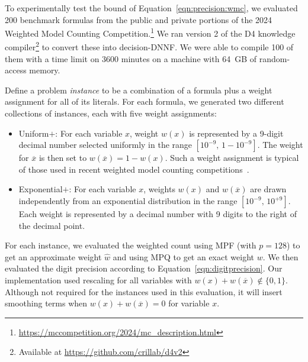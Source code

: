 \documentclass[letterpaper,USenglish,cleveref, autoref, thm-restate]{lipics-v2021}
\newcommand{\obar}[1]{\overline{#1}}
\newcommand{\approximate}[1]{\hat{#1}}
\newcommand{\approxw}{\approximate{w}}
\begin{document}
To experimentally test the bound of Equation~\ref{eqn:precision:wmc},
we evaluated 200 benchmark formulas from the public and private portions
of the 2024 Weighted Model Counting Competition.\footnote{\url{https://mccompetition.org/2024/mc_description.html}}
We ran version 2 of the
D4 knowledge compiler\footnote{Available at \url{https://github.com/crillab/d4v2}}
to convert these into decision-DNNF\@.
We were able to compile 100 of them with a time
limit on 3600 minutes on a machine with 64~GB of random-access memory.

Define a problem \emph{instance} to be a combination of a formula
plus a weight assignment for all of its literals.
For each formula, we generated two different collections of instances, each with five weight assignments:
\begin{itemize}
\item \textsf{Uniform$+$}: For each variable $x$, weight $w(x)$ is represented by a 9-digit decimal number selected uniformly in the range
  $[10^{-9},\,1-10^{-9}]$. The weight for $\obar{x}$ is then set to
  $w(\obar{x}) = 1-w(x)$.  Such a weight assignment is typical of those used in recent weighted model counting competitions~\cite{fichte:jea:2020}.
\item \textsf{Exponential$+$}: For each variable $x$, weights $w(x)$ and $w(\obar{x})$
  are drawn independently from an exponential distribution in the range
  $[10^{-9},\,10^{+9}]$.  Each weight is represented by a decimal number with 9 digits to the right of the decimal point.
\end{itemize}


For each instance, we evaluated
the weighted count using MPF (with $p=128$) to get an approximate weight $\approxw$ and
using MPQ to get an exact weight $w$.  We then evaluated the digit precision according to Equation~\ref{eqn:digitprecision}.   Our implementation used rescaling for all variables
with $w(x) + w(\obar{x}) \not \in \{0, 1\}$.
Although not required for the instances used in this evaluation,
it will insert smoothing terms when $w(x) + w(\obar{x}) = 0$ for variable $x$.
\end{document}
